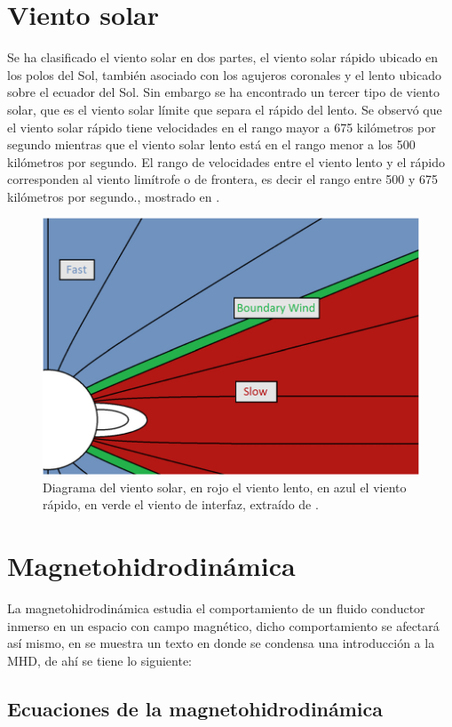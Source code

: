 \section{Viento solar}
Se ha clasificado el viento solar en dos partes, el viento solar rápido ubicado en los polos del Sol, también asociado con los agujeros coronales y el lento ubicado sobre el ecuador del Sol. Sin embargo se ha encontrado un tercer tipo de viento solar, que es el viento solar límite que separa el rápido del lento. Se observó que el viento solar rápido tiene velocidades en el rango mayor a 675 kilómetros por segundo mientras que el viento solar lento está en el rango menor a los 500 kilómetros por segundo. El rango de velocidades entre el viento lento y el rápido corresponden al viento limítrofe o de frontera, es decir el rango entre 500 y 675 kilómetros por segundo., mostrado en \cite[e.g.,][]{stakhiv-2015}.
\begin{figure}
    \centering
    \includegraphics[width=0.7\linewidth]{Imagenes Mein/viento solar.png}
    \caption[Distribución del viento solar (lento, de interfaz, rápido) al rededor del Sol]{Diagrama del viento solar, en rojo el viento lento, en azul el viento rápido, en verde el viento de interfaz, extraído de \cite{stakhiv-2015}.}
    \label{fig:placeholder}
\end{figure}

\section{Magnetohidrodinámica}
La magnetohidrodinámica estudia el comportamiento de un fluido conductor inmerso en un espacio con campo magnético, dicho comportamiento se afectará así mismo, en \cite{cowling-1976} se muestra un texto en donde se condensa una introducción a la MHD, de ahí se tiene lo siguiente:
\subsection{Ecuaciones de la magnetohidrodinámica}

